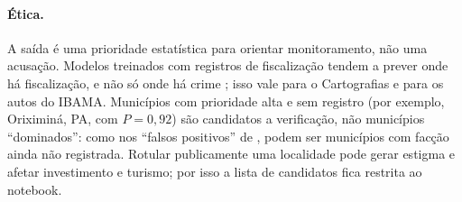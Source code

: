 \documentclass[10pt,a4paper,twocolumn]{article}
\begin{document}
\paragraph{Ética.} A saída é uma prioridade estatística para orientar monitoramento, não uma
acusação. Modelos treinados com registros de fiscalização tendem a prever onde há
fiscalização, e não só onde há crime \cite{r20}; isso vale para o Cartografias e para os
autos do IBAMA. Municípios com prioridade alta e sem registro (por exemplo, Oriximiná, PA,
com $P=0{,}92$) são candidatos a verificação, não municípios ``dominados'': como nos
``falsos positivos'' de \cite{r17}, podem ser municípios com facção ainda não registrada.
Rotular publicamente uma localidade pode gerar estigma e afetar investimento e turismo; por
isso a lista de candidatos fica restrita ao notebook.
\end{document}
